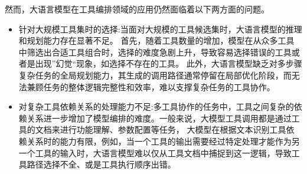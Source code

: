 然而，大语言模型在工具编排领域的应用仍然面临着以下两方面的问题。


\begin{itemize}
    \item 针对大规模工具集时的选择:当面对大规模的工具候选集时，大语言模型的推理和规划能力存在显著不足。
    首先，随着工具数量的增加，模型在从众多工具中筛选出合适工具组合时，选择的难度急剧上升，导致容易选择错误的工具或者是出现”幻觉“现象，如选择不存在的工具。
    此外，大语言模型缺乏对多步骤复杂任务的全局规划能力，其生成的调用路径通常停留在局部优化阶段，而无法兼顾任务的整体逻辑完整性和效率，难以支撑复杂任务的工具协作。
    \item 对复杂工具依赖关系的处理能力不足:多工具协作的任务中，工具之间复杂的依赖关系进一步增加了模型编排的难度。一般来说，大模型工具调用都是通过工具的文档来进行功能理解、参数配置等任务，
    大模型在根据文本识别工具依赖关系时的能力有限，例如，当一个工具的输出需要经过特定处理才能作为另一个工具的输入时，大语言模型难以仅从工具文档中捕捉到这一逻辑，导致工具路径选择不全、或是工具执行顺序出错。
\end{itemize}


% 
% 
% 

